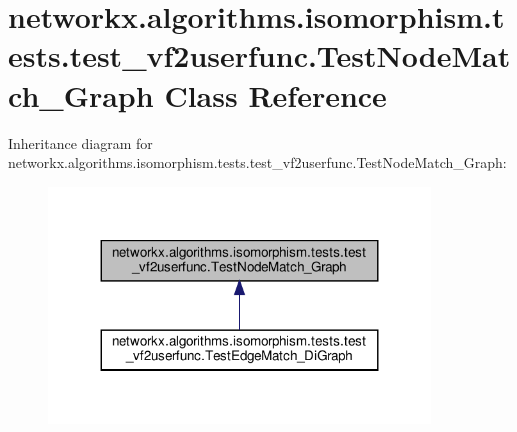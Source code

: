 \hypertarget{classnetworkx_1_1algorithms_1_1isomorphism_1_1tests_1_1test__vf2userfunc_1_1TestNodeMatch__Graph}{}\section{networkx.\+algorithms.\+isomorphism.\+tests.\+test\+\_\+vf2userfunc.\+Test\+Node\+Match\+\_\+\+Graph Class Reference}
\label{classnetworkx_1_1algorithms_1_1isomorphism_1_1tests_1_1test__vf2userfunc_1_1TestNodeMatch__Graph}


Inheritance diagram for networkx.\+algorithms.\+isomorphism.\+tests.\+test\+\_\+vf2userfunc.\+Test\+Node\+Match\+\_\+\+Graph\+:
\nopagebreak
\begin{figure}[H]
\begin{center}
\leavevmode
\includegraphics[width=287pt]{classnetworkx_1_1algorithms_1_1isomorphism_1_1tests_1_1test__vf2userfunc_1_1TestNodeMatch__Graph__inherit__graph}
\end{center}
\end{figure}
